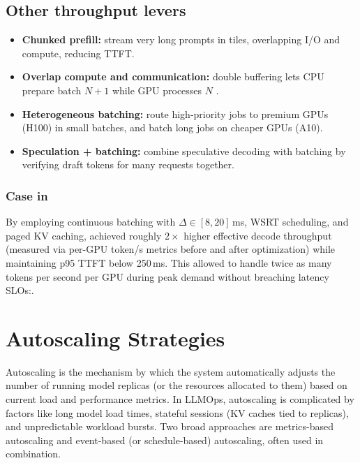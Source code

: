 \subsection{Other throughput levers}\label{sec:throughput-levers}
\begin{itemize}
  \item \textbf{Chunked prefill:} stream very long prompts in tiles, overlapping I/O and compute, reducing TTFT.
  \item \textbf{Overlap compute and communication:} double buffering lets CPU prepare batch $N{+}1$ while GPU processes $N$ \cite{scalingintelligence.stanford.edu}.
  \item \textbf{Heterogeneous batching:} route high-priority jobs to premium GPUs (H100) in small batches, and batch long jobs on cheaper GPUs (A10).
  \item \textbf{Speculation + batching:} combine speculative decoding with batching by verifying draft tokens for many requests together.
\end{itemize}

\subsubsection{Case in \ishtar{}}
By employing continuous batching with $\Delta \in [8,20]$\,ms, WSRT scheduling, and paged KV caching, \ishtar{} achieved roughly $2\times$ higher effective decode throughput (measured via per-GPU token/s metrics before and after optimization) while maintaining p95 TTFT below 250\,ms. This allowed \ishtar{} to handle twice as many tokens per second per GPU during peak demand without breaching latency SLOs:\cite{vllm_pagedattention}.


\section{Autoscaling Strategies}
\label{sec:autoscaling}
Autoscaling is the mechanism by which the system automatically adjusts the number of running model replicas (or the resources allocated to them) based on current load and performance metrics. In LLMOps, autoscaling is complicated by factors like long model load times, stateful sessions (KV caches tied to replicas), and unpredictable workload bursts. Two broad approaches are metrics-based autoscaling and event-based (or schedule-based) autoscaling, often used in combination.

